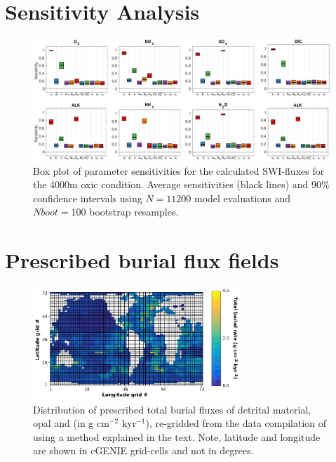 \documentclass[gmd, manuscript]{copernicus}
\begin{document}
\pagebreak

\section{Sensitivity Analysis} 


\begin{figure}[htbp]
\begin{center}
	\includegraphics[width=1.0\textwidth]{figures/SA/0_SIndex_4000m_ALL_combined.pdf}
	\caption{Box plot of parameter sensitivities for the calculated SWI-fluxes for the 4000m oxic condition. 
	Average sensitivities (black lines) and 90\% confidence intervals using $N=11200$ model evaluations and $Nboot = 100$ bootstrap resamples.}
	\label{fig:SA_O2+NO3}
	\end{center}
\end{figure}


\pagebreak

\section{Prescribed burial flux fields} 
\begin{figure}[hbp]
\begin{center}
	\includegraphics[width=0.7\textwidth]{figures/OMEN-GENIE-Exp/Solid_field_mask.pdf}
	\caption[Distribution of prescribed total burial fluxes of detrital material, opal and ]{Distribution of prescribed total burial fluxes of detrital material, opal and  (in g cm$^{-2}$ kyr$^{-1}$), 
	re-gridded from the data compilation of \citet{archer_data-driven_1996} using a method explained in the text. Note, latitude and longitude are shown in cGENIE grid-cells and not in degrees.}
	\label{fig:GENIE_sum_burial_flux}
	\end{center}
\end{figure}
\end{document}
